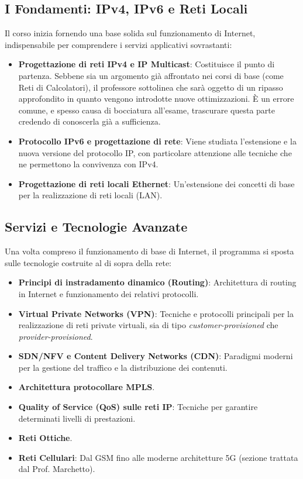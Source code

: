 \subsection{I Fondamenti: IPv4, IPv6 e Reti Locali}
Il corso inizia fornendo una base solida sul funzionamento di Internet, indispensabile per comprendere i servizi applicativi sovrastanti:
\begin{itemize}
    \item \textbf{Progettazione di reti IPv4 e IP Multicast}: Costituisce il punto di partenza. Sebbene sia un argomento già affrontato nei corsi di base (come Reti di Calcolatori), il professore sottolinea che sarà oggetto di un ripasso approfondito in quanto vengono introdotte nuove ottimizzazioni. È un errore comune, e spesso causa di bocciatura all'esame, trascurare questa parte credendo di conoscerla già a sufficienza.
    \item \textbf{Protocollo IPv6 e progettazione di rete}: Viene studiata l'estensione e la nuova versione del protocollo IP, con particolare attenzione alle tecniche che ne permettono la convivenza con IPv4.
    \item \textbf{Progettazione di reti locali Ethernet}: Un'estensione dei concetti di base per la realizzazione di reti locali (LAN).
\end{itemize}

\subsection{Servizi e Tecnologie Avanzate}
Una volta compreso il funzionamento di base di Internet, il programma si sposta sulle tecnologie costruite al di sopra della rete:
\begin{itemize}
    \item \textbf{Principi di instradamento dinamico (Routing)}: Architettura di routing in Internet e funzionamento dei relativi protocolli.
    \item \textbf{Virtual Private Networks (VPN)}: Tecniche e protocolli principali per la realizzazione di reti private virtuali, sia di tipo \emph{customer-provisioned} che \emph{provider-provisioned}.
    \item \textbf{SDN/NFV e Content Delivery Networks (CDN)}: Paradigmi moderni per la gestione del traffico e la distribuzione dei contenuti.
    \item \textbf{Architettura protocollare MPLS}.
    \item \textbf{Quality of Service (QoS) sulle reti IP}: Tecniche per garantire determinati livelli di prestazioni.
    \item \textbf{Reti Ottiche}.
    \item \textbf{Reti Cellulari}: Dal GSM fino alle moderne architetture 5G (sezione trattata dal Prof. Marchetto).
\end{itemize}

